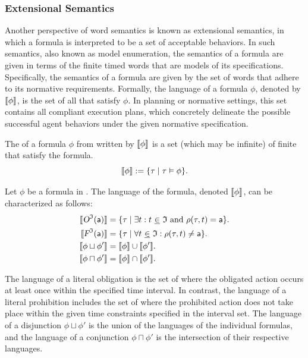 \subsubsection{Extensional Semantics}
 Another perspective of word semantics is known as extensional semantics, in which a formula is interpreted to be a set of acceptable behaviors. In such semantics, also known as model enumeration, the semantics of a formula are given in terms of the finite timed words that are models of its specifications. Specifically, the semantics of a formula are given by the set of words that adhere to its normative requirements. Formally, the language of a formula $\phi$, denoted by $\llbracket \phi \rrbracket$, is the set of all \timedwords that satisfy $\phi$. In planning or normative settings, this set contains all compliant execution plans, which concretely delineate the possible successful agent behaviors under the given normative specification.

\begin{definition}\label{language}
The  of a formula \(\phi\) from \TDDLfm written by
\(\llbracket \phi \rrbracket\) is a set (which may be infinite) of finite \timedwords that satisfy the formula.  $$\llbracket \phi \rrbracket := \{\tau \mid \tau \vDash  \phi\}.$$ 
\end{definition}
\begin{lemma}  \label{lemma:characdl}
Let \(\phi\) be a formula in \TDDLfm. The language of the formula, denoted \(\llbracket \phi \rrbracket\), can be characterized as follows:
\begin{align*} \llbracket \textsl{O}^{\mathfrak{I}}(\mathsf{a}) \rrbracket &= \{\tau \mid \exists t : t ~\underline{\in}~ \mathfrak{I} \text{ and } \rho(\tau,t)=\mathsf{a}  \} .\\ 
\llbracket \textsl{F}^{\mathfrak{I}}(\mathsf{a}) \rrbracket &= \{\tau \mid \forall t ~\underline{\in}~ \mathfrak{I}: \rho(\tau,t)\neq \mathsf{a}  \}. \\ 
\llbracket \phi \sqcup \phi' \rrbracket &= \llbracket \phi \rrbracket \cup \llbracket \phi' \rrbracket .\\ 
\llbracket \phi \sqcap \phi' \rrbracket &= \llbracket \phi \rrbracket \cap \llbracket \phi' \rrbracket.
\end{align*} 
\end{lemma}

The language of a literal obligation is the set of \timedwords where the obligated action occurs at least once within the specified time interval. In contrast, the language of a literal prohibition includes the set of \timedwords where the prohibited action does not take place within the given time constraints specified in the interval set. The language of a disjunction $\phi \sqcup \phi'$ is the union of the languages of the individual formulas, and the language of a conjunction $\phi \sqcap \phi'$ is the intersection of their respective languages.

